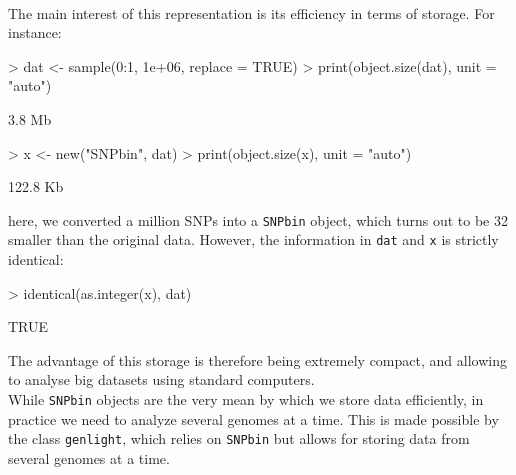 \documentclass{article}
\begin{document}
~\\

The main interest of this representation is its efficiency in terms of storage.
For instance:
\begin{Schunk}
\begin{Sinput}
> dat <- sample(0:1, 1e+06, replace = TRUE)
> print(object.size(dat), unit = "auto")
\end{Sinput}
\begin{Soutput}
3.8 Mb
\end{Soutput}
\begin{Sinput}
> x <- new("SNPbin", dat)
> print(object.size(x), unit = "auto")
\end{Sinput}
\begin{Soutput}
122.8 Kb
\end{Soutput}
\end{Schunk}
here, we converted a million SNPs into a \texttt{SNPbin} object, which turns out to be
32 smaller than the original data.
However, the information in \texttt{dat} and \texttt{x} is strictly identical:
\begin{Schunk}
\begin{Sinput}
> identical(as.integer(x), dat)
\end{Sinput}
\begin{Soutput}
[1] TRUE
\end{Soutput}
\end{Schunk}
The advantage of this storage is therefore being extremely compact, and allowing to analyse big
datasets using standard computers.
\\

While \texttt{SNPbin} objects are the very mean by which we store data efficiently, in practice
we need to analyze several genomes at a time.
This is made possible by the class \texttt{genlight}, which relies on \texttt{SNPbin} but allows for
storing data from several genomes at a time.




\end{document}
